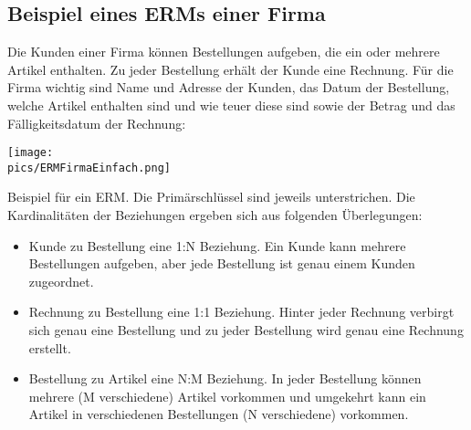 \subsection{Beispiel eines ERMs einer Firma}
Die Kunden einer Firma können Bestellungen aufgeben, die ein oder mehrere Artikel enthalten. Zu jeder Bestellung erhält der Kunde eine Rechnung. Für die Firma wichtig sind Name und Adresse der Kunden, das Datum der Bestellung, welche Artikel enthalten sind und wie teuer diese sind sowie der Betrag und das Fälligkeitsdatum der Rechnung:
\begin{minipage}{\textwidth}
	\centering\texttt{[image: \\pics/ERMFirmaEinfach.png]}\\
\end{minipage}
Beispiel für ein ERM. Die Primärschlüssel sind jeweils unterstrichen. Die Kardinalitäten der Beziehungen ergeben sich aus folgenden Überlegungen:
\begin{itemize}
	\item Kunde zu Bestellung eine 1:N Beziehung. Ein Kunde kann mehrere Bestellungen aufgeben, aber jede Bestellung ist genau einem Kunden zugeordnet.
	\item Rechnung zu Bestellung eine 1:1 Beziehung. Hinter jeder Rechnung verbirgt sich genau eine Bestellung und zu jeder Bestellung wird genau eine Rechnung erstellt.
	\item Bestellung zu Artikel eine N:M Beziehung. In jeder Bestellung können mehrere (M verschiedene) Artikel vorkommen und umgekehrt kann ein Artikel in verschiedenen Bestellungen (N verschiedene) vorkommen.
\end{itemize}
\begin{Exercise}[title=Vervollständige die ERMs aus Aufgabe \ref{ERMErstellen1}. Jeder Entitätstyp muss einen Primärschlüssel haben und ergänze die Kardinalitäten., label=ERMErstellen2]
	\phantom{ }
\end{Exercise}

